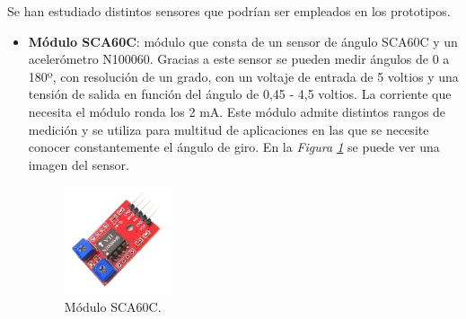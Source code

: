 Se han estudiado distintos sensores que podrían ser empleados en los prototipos.

\begin{itemize}
    \item \textbf{Módulo SCA60C}\cite{SCA60C}: módulo que consta de un sensor de ángulo SCA60C y un acelerómetro N100060. Gracias a este sensor se pueden medir ángulos de 0 a 180º, con resolución de un grado, con un voltaje de entrada de 5 voltios y una tensión de salida en función del ángulo de 0,45 - 4,5 voltios. La corriente que necesita el módulo ronda los 2 mA. Este módulo admite distintos rangos de medición y se utiliza para multitud de aplicaciones en las que se necesite conocer constantemente el ángulo de giro. En la \textit{Figura \ref{fig:SCA60C}} se puede ver una imagen del sensor.
\begin{figure}[h!]
    \centering
    \includegraphics[width=0.3\textwidth]{img/imgSCA60C.jpg}
    \caption{Módulo SCA60C\cite{imgSCA60C}.}
    \label{fig:SCA60C} 
\end{figure}
    

\end{itemize}
